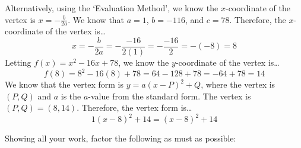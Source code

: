 \documentclass[12pt,letterpaper]{exam}
\begin{document}
\begin{questions}
{Alternatively, using the `Evaluation Method', we know the $x$-coordinate of the vertex is $x= -\frac{b}{2a}$. We know that $a= 1$, $b= -116$, and $c= 78$. Therefore, the $x$-coordinate of the vertex is\dots
	\[
	x= -\dfrac{b}{2a}= -\dfrac{-16}{2(1)}= -\dfrac{-16}{2}= -(-8)= 8
	\] \pspace
Letting $f(x)= x^2 - 16x + 78$, we know the $y$-coordinate of the vertex is\dots
	\[
	f(8)= 8^2 - 16(8) + 78= 64 - 128 + 78= -64 + 78= 14
	\] \pspace
We know that the vertex form is $y= a(x - P)^2 + Q$, where the vertex is $(P, Q)$ and $a$ is the $a$-value from the standard form. The vertex is $(P, Q)= (8, 14)$. Therefore, the vertex form is\dots
	\[
	1(x - 8)^2 + 14= \boxed{(x - 8)^2 + 14}
	\]
}



\newpage
\question[8] Showing all your work, factor the following as must as possible: \par\vspace{0.3cm}
\end{questions}
\end{document}
